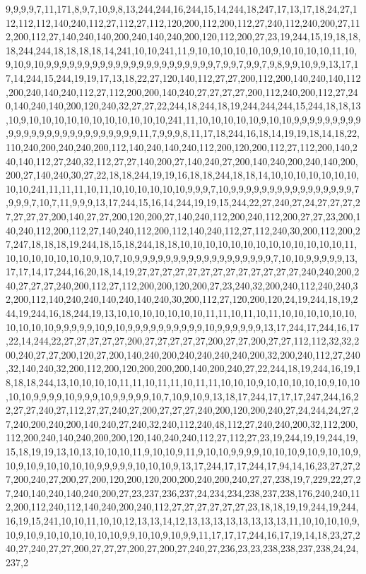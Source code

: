 9,9,9,9,7,11,171,8,9,7,10,9,8,13,244,244,16,244,15,14,244,18,247,17,13,17,18,24,27,112,112,112,140,240,112,27,112,27,112,120,200,112,200,112,27,240,112,240,200,27,112,200,112,27,140,240,140,200,240,140,240,200,120,112,200,27,23,19,244,15,19,18,18,18,244,244,18,18,18,18,14,241,10,10,241,11,9,10,10,10,10,10,10,9,10,10,10,10,11,10,9,10,9,10,9,9,9,9,9,9,9,9,9,9,9,9,9,9,9,9,9,9,9,9,9,9,7,9,9,7,9,9,7,9,8,9,9,10,9,9,13,17,17,14,244,15,244,19,19,17,13,18,22,27,120,140,112,27,27,200,112,200,140,240,140,112,200,240,140,240,112,27,112,200,200,140,240,27,27,27,27,200,112,240,200,112,27,240,140,240,140,200,120,240,32,27,27,22,244,18,244,18,19,244,244,244,15,244,18,18,13,10,9,10,10,10,10,10,10,10,10,10,10,10,241,11,10,10,10,10,10,9,10,10,9,9,9,9,9,9,9,9,9,9,9,9,9,9,9,9,9,9,9,9,9,9,9,9,9,9,11,7,9,9,9,8,11,17,18,244,16,18,14,19,19,18,14,18,22,110,240,200,240,240,200,112,140,240,140,240,112,200,120,200,112,27,112,200,140,240,140,112,27,240,32,112,27,27,140,200,27,140,240,27,200,140,240,200,240,140,200,200,27,140,240,30,27,22,18,18,244,19,19,16,18,18,244,18,18,14,10,10,10,10,10,10,10,10,10,241,11,11,11,10,11,10,10,10,10,10,10,9,9,9,7,10,9,9,9,9,9,9,9,9,9,9,9,9,9,9,9,9,7,9,9,9,7,10,7,11,9,9,9,13,17,244,15,16,14,244,19,19,15,244,22,27,240,27,24,27,27,27,27,27,27,27,200,140,27,27,200,120,200,27,140,240,112,200,240,112,200,27,27,23,200,140,240,112,200,112,27,140,240,112,200,112,140,240,112,27,112,240,30,200,112,200,27,247,18,18,18,19,244,18,15,18,244,18,18,10,10,10,10,10,10,10,10,10,10,10,10,10,11,10,10,10,10,10,10,10,9,10,7,10,9,9,9,9,9,9,9,9,9,9,9,9,9,9,9,9,9,9,7,10,10,9,9,9,9,9,13,17,17,14,17,244,16,20,18,14,19,27,27,27,27,27,27,27,27,27,27,27,27,27,240,240,200,240,27,27,27,240,200,112,27,112,200,200,120,200,27,23,240,32,200,240,112,240,240,32,200,112,140,240,240,140,240,140,240,30,200,112,27,120,200,120,24,19,244,18,19,244,19,244,16,18,244,19,13,10,10,10,10,10,10,10,11,11,10,11,10,11,10,10,10,10,10,10,10,10,10,10,9,9,9,9,9,10,9,10,9,9,9,9,9,9,9,9,9,9,10,9,9,9,9,9,9,13,17,244,17,244,16,17,22,14,244,22,27,27,27,27,27,200,27,27,27,27,27,200,27,27,200,27,27,112,112,32,32,200,240,27,27,200,120,27,200,140,240,200,240,240,240,240,200,32,200,240,112,27,240,32,140,240,32,200,112,200,120,200,200,200,140,200,240,27,22,244,18,19,244,16,19,18,18,18,244,13,10,10,10,10,11,11,10,11,11,10,11,11,10,10,10,9,10,10,10,10,10,9,10,10,10,10,9,9,9,9,10,9,9,9,10,9,9,9,9,9,10,7,10,9,10,9,13,18,17,244,17,17,17,247,244,16,22,27,27,240,27,112,27,27,240,27,200,27,27,27,240,200,120,200,240,27,24,244,24,27,27,240,200,240,200,140,240,27,240,32,240,112,240,48,112,27,240,240,200,32,112,200,112,200,240,140,240,200,200,120,140,240,240,112,27,112,27,23,19,244,19,19,244,19,15,18,19,19,13,10,13,10,10,10,11,9,10,10,9,11,9,10,10,9,9,9,9,10,10,10,9,10,9,10,10,9,10,9,10,9,10,10,10,10,9,9,9,9,9,10,10,10,9,13,17,244,17,17,244,17,94,14,16,23,27,27,27,200,240,27,200,27,200,120,200,120,200,200,240,200,240,27,27,238,19,7,229,22,27,27,240,140,240,140,240,200,27,23,237,236,237,24,234,234,238,237,238,176,240,240,112,200,112,240,112,140,240,200,240,112,27,27,27,27,27,27,23,18,18,19,19,244,19,244,16,19,15,241,10,10,11,10,10,12,13,13,14,12,13,13,13,13,13,13,13,13,11,10,10,10,10,9,10,9,10,9,10,10,10,10,10,10,9,9,10,10,9,10,9,9,11,17,17,17,244,16,17,19,14,18,23,27,240,27,240,27,27,200,27,27,27,200,27,200,27,240,27,236,23,23,238,238,237,238,24,24,237,2